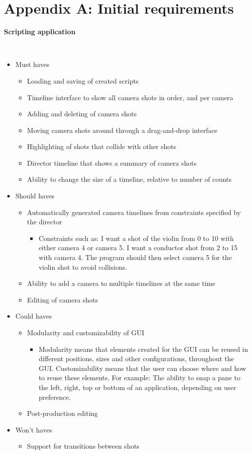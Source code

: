 \section*{Appendix A: Initial requirements}

\begin{large}
\textbf{Scripting application}
\end{large}\\
\begin{itemize}
\item Must haves
\begin{itemize}
\item Loading and saving of created scripts
\item Timeline interface to show all camera shots in order, and per camera
\item Adding and deleting of camera shots
\item Moving camera shots around through a drag-and-drop interface
\item Highlighting of shots that collide with other shots
\item Director timeline that shows a summary of camera shots
\item Ability to change the size of a timeline, relative to number of counts
\end{itemize}
\item Should haves
\begin{itemize}
\item Automatically generated camera timelines from constraints specified by the director
\begin{itemize}
\item Constraints such as: I want a shot of the violin from 0 to 10 with either camera 4 or camera 5. I want a conductor shot from 2 to 15 with camera 4. The program should then select camera 5 for the violin shot to avoid collisions.
\end{itemize}
\item Ability to add a camera to multiple timelines at the same time
\item Editing of camera shots
\end{itemize}
\item Could haves
\begin{itemize}
\item Modularity and customizability of GUI
\begin{itemize}
\item Modularity means that elements created for the GUI can be reused in different positions, sizes and other configurations, throughout the GUI. Customizability means that the user can choose where and how to reuse these elements. For example: The ability to snap a pane to the left, right, top or bottom of an application, depending on user preference.
\end{itemize}
\item Post-production editing
\end{itemize}
\item Won't haves
\begin{itemize}
\item Support for transitions between shots
\end{itemize}
\end{itemize}
